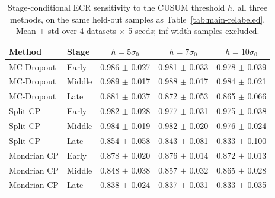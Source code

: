 \begin{table}[t]
\caption{Stage-conditional ECR sensitivity to the CUSUM threshold $h$, all three methods, on the same held-out samples as Table~\ref{tab:main-relabeled}. Mean $\pm$ std over 4 datasets $\times$ 5 seeds; inf-width samples excluded.}
\label{tab:hsens-relabeled}
\centering
\begin{tabular}{llccc}
\toprule
Method & Stage & $h=5\sigma_0$ & $h=7\sigma_0$ & $h=10\sigma_0$ \\
\midrule
MC-Dropout & Early & 0.986 $\pm$ 0.027 & 0.981 $\pm$ 0.033 & 0.978 $\pm$ 0.039 \\
MC-Dropout & Middle & 0.989 $\pm$ 0.017 & 0.988 $\pm$ 0.017 & 0.984 $\pm$ 0.021 \\
MC-Dropout & Late & 0.881 $\pm$ 0.037 & 0.872 $\pm$ 0.053 & 0.865 $\pm$ 0.066 \\
Split CP & Early & 0.982 $\pm$ 0.028 & 0.977 $\pm$ 0.031 & 0.975 $\pm$ 0.038 \\
Split CP & Middle & 0.984 $\pm$ 0.019 & 0.982 $\pm$ 0.020 & 0.976 $\pm$ 0.024 \\
Split CP & Late & 0.854 $\pm$ 0.058 & 0.843 $\pm$ 0.081 & 0.833 $\pm$ 0.100 \\
Mondrian CP & Early & 0.878 $\pm$ 0.020 & 0.876 $\pm$ 0.014 & 0.872 $\pm$ 0.013 \\
Mondrian CP & Middle & 0.848 $\pm$ 0.038 & 0.857 $\pm$ 0.032 & 0.865 $\pm$ 0.028 \\
Mondrian CP & Late & 0.838 $\pm$ 0.024 & 0.837 $\pm$ 0.031 & 0.833 $\pm$ 0.035 \\
\bottomrule
\end{tabular}
\end{table}
